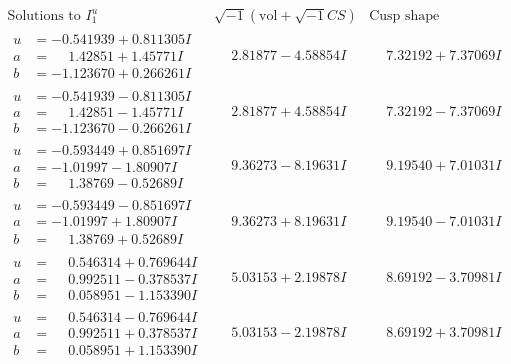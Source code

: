 \documentclass[1p]{elsarticle_modified}
\theoremstyle{definition}
\newcommand{\I}{\sqrt{-1}}
\begin{document}
$$\begin{array}{c|c|c}  
\text{Solutions to }I^u_{1}& \I (\text{vol} + \sqrt{-1}CS) & \text{Cusp shape}\\
 \hline 
\begin{aligned}
u &= -0.541939 + 0.811305 I \\
a &= \phantom{-}1.42851 + 1.45771 I \\
b &= -1.123670 + 0.266261 I\end{aligned}
 & \phantom{-}2.81877 - 4.58854 I & \phantom{-}7.32192 + 7.37069 I \\ \hline\begin{aligned}
u &= -0.541939 - 0.811305 I \\
a &= \phantom{-}1.42851 - 1.45771 I \\
b &= -1.123670 - 0.266261 I\end{aligned}
 & \phantom{-}2.81877 + 4.58854 I & \phantom{-}7.32192 - 7.37069 I \\ \hline\begin{aligned}
u &= -0.593449 + 0.851697 I \\
a &= -1.01997 - 1.80907 I \\
b &= \phantom{-}1.38769 - 0.52689 I\end{aligned}
 & \phantom{-}9.36273 - 8.19631 I & \phantom{-}9.19540 + 7.01031 I \\ \hline\begin{aligned}
u &= -0.593449 - 0.851697 I \\
a &= -1.01997 + 1.80907 I \\
b &= \phantom{-}1.38769 + 0.52689 I\end{aligned}
 & \phantom{-}9.36273 + 8.19631 I & \phantom{-}9.19540 - 7.01031 I \\ \hline\begin{aligned}
u &= \phantom{-}0.546314 + 0.769644 I \\
a &= \phantom{-}0.992511 - 0.378537 I \\
b &= \phantom{-}0.058951 - 1.153390 I\end{aligned}
 & \phantom{-}5.03153 + 2.19878 I & \phantom{-}8.69192 - 3.70981 I \\ \hline\begin{aligned}
u &= \phantom{-}0.546314 - 0.769644 I \\
a &= \phantom{-}0.992511 + 0.378537 I \\
b &= \phantom{-}0.058951 + 1.153390 I\end{aligned}
 & \phantom{-}5.03153 - 2.19878 I & \phantom{-}8.69192 + 3.70981 I \\ \hline\begin{aligned}

\end{aligned}
\end{array}$$
\end{document}
